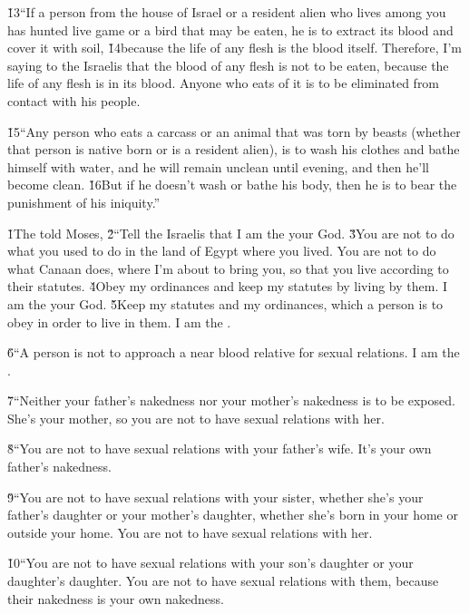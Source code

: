 \v{13}``If a person from the house of Israel or a resident alien who lives among you has hunted live game or a bird that may be eaten, he is to extract its blood and cover it with soil, \v{14}because the life of any flesh is the blood itself. Therefore, I'm saying to the Israelis that the blood of any flesh is not to be eaten, because the life of any flesh is in its blood. Anyone who eats of it is to be eliminated from contact with his people.

\v{15}``Any person who eats a carcass or an animal that was torn by beasts (whether that person is native born or is a resident alien), is to wash his clothes and bathe himself with water, and he will remain unclean until evening, and then he'll become clean. \v{16}But if he doesn't wash or bathe his body, then he is to bear the punishment of his iniquity.''

\v{1}The  told Moses, \v{2}``Tell the Israelis that I am the  your God. \v{3}You are not to do what you used to do in the land of Egypt where you lived. You are not to do what Canaan does, where I'm about to bring you, so that you live according to their statutes. \v{4}Obey my ordinances and keep my statutes by living by them. I am the  your God. \v{5}Keep my statutes and my ordinances, which a person is to obey in order to live in them. I am the .

\v{6}``A person is not to approach a near blood relative for sexual relations. I am the .

\v{7}``Neither your father's nakedness nor your mother's nakedness is to be exposed. She's your mother, so you are not to have sexual relations with her.

\v{8}``You are not to have sexual relations with your father's wife. It's your own father's nakedness.

\v{9}``You are not to have sexual relations with your sister, whether she's your father's daughter or your mother's daughter, whether she's born in your home or outside your home. You are not to have sexual relations with her.

\v{10}``You are not to have sexual relations with your son's daughter or your daughter's daughter. You are not to have sexual relations with them, because their nakedness is your own nakedness.

